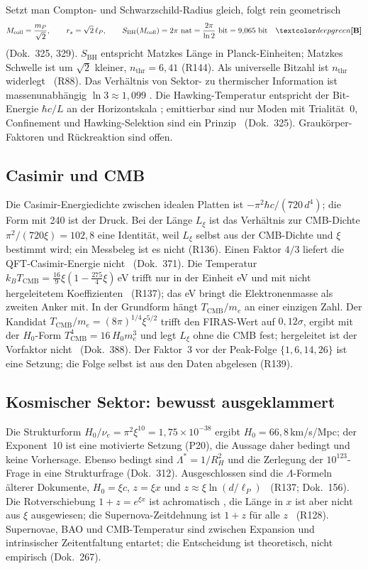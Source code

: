 Setzt man Compton- und Schwarzschild-Radius gleich, folgt rein geometrisch
\begin{equation}
  M_{\text{coll}}=\frac{m_P}{\sqrt2},\qquad r_s=\sqrt2\,\ell_P,\qquad
  S_{\text{BH}}(M_{\text{coll}})=2\pi\ \text{nat}=\frac{2\pi}{\ln2}\ \text{bit}=9{,}065\ \text{bit}\quad\BM
\end{equation}
(Dok.~325, 329). $S_{\text{BH}}$ entspricht Matzkes Länge in Planck-Einheiten; Matzkes Schwelle ist
um $\sqrt2$ kleiner, $n_{\text{thr}}=6{,}41$ (R144). Als universelle Bitzahl ist $n_{\text{thr}}$
widerlegt \XM\ (R88). Das Verhältnis von Sektor- zu thermischer Information ist massenunabhängig
$\ln3\approx1{,}099$ \BM. Die Hawking-Temperatur entspricht der Bit-Energie $\hbar c/L$ an der
Horizontskala \KM; emittierbar sind nur Moden mit Trialität~0, Confinement und Hawking-Selektion
sind ein Prinzip \BM\ (Dok.~325). Graukörper-Faktoren und Rückreaktion sind offen.

\subsection{Casimir und CMB}

Die Casimir-Energiedichte zwischen idealen Platten ist $-\pi^2\hbar c/(720\,d^4)$; die Form mit
240 ist der Druck. Bei der Länge $L_\xi$ ist das Verhältnis zur CMB-Dichte
$\pi^2/(720\xi)=102{,}8$ eine Identität, weil $L_\xi$ selbst aus der CMB-Dichte und $\xi$
bestimmt wird; ein Messbeleg ist es nicht (R136). Einen Faktor $4/3$ liefert die
QFT-Casimir-Energie nicht \XM\ (Dok.~371). Die Temperatur
$k_BT_{\text{CMB}}=\tfrac{16}{9}\xi(1-\tfrac{275}{4}\xi)$\,eV trifft nur in der Einheit eV und
mit nicht hergeleitetem Koeffizienten \SM\ (R137); das eV bringt die Elektronenmasse als
zweiten Anker mit. In der Grundform hängt $T_{\text{CMB}}/m_e$ an einer einzigen Zahl. Der
Kandidat $T_{\text{CMB}}/m_e=(8\pi)^{1/4}\xi^{5/2}$ trifft den FIRAS-Wert auf $0{,}12\sigma$,
ergibt mit der $H_0$-Form $T_{\text{CMB}}^4=16\,H_0m_e^3$ und legt $L_\xi$ ohne die CMB fest;
hergeleitet ist der Vorfaktor nicht \SM\ (Dok.~388). Der Faktor~3 vor der Peak-Folge
$\{1,6,14,26\}$ ist eine Setzung; die Folge selbst ist aus den Daten abgelesen (R139).

\subsection{Kosmischer Sektor: bewusst ausgeklammert}

Die Strukturform $H_0/\nu_e=\pi^2\xi^{10}=1{,}75\times10^{-38}$ ergibt $H_0=66{,}8$\,km/s/Mpc;
der Exponent~10 ist eine motivierte Setzung (P20), die Aussage daher bedingt und keine
Vorhersage. Ebenso bedingt sind $\Lambda^*=1/R_H^2$ und die Zerlegung der $10^{123}$-Frage in
eine Strukturfrage (Dok.~312). Ausgeschlossen sind die $\Lambda$-Formeln älterer Dokumente,
$H_0=\xi c$, $z=\xi x$ und $z\approx\xi\ln(d/\ell_P)$ \XM\ (R137; Dok.~156). Die Rotverschiebung
$1+z=e^{\xi x}$ ist achromatisch \KM, die Länge in $x$ ist aber nicht aus $\xi$ ausgewiesen; die
Supernova-Zeitdehnung ist $1+z$ für alle $z$ \BM\ (R128). Supernovae, BAO und CMB-Temperatur sind
zwischen Expansion und intrinsischer Zeitentfaltung entartet; die Entscheidung ist theoretisch,
nicht empirisch (Dok.~267).


